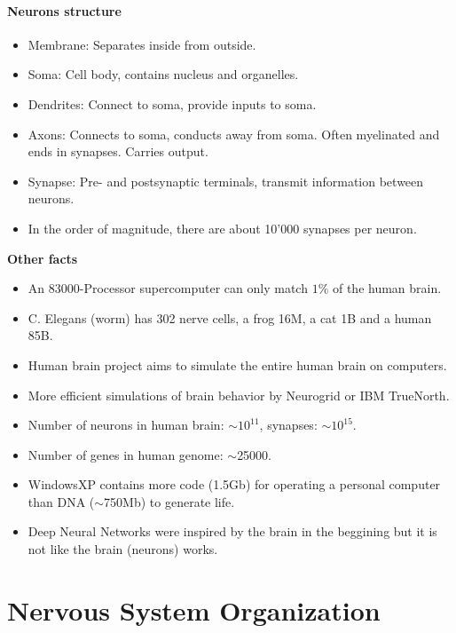 \documentclass[a4paper, 12pt]{article}
\begin{document}
\paragraph{Neurons structure}
\begin{itemize}[noitemsep,nolistsep]
	\item Membrane: Separates inside from outside.
	\item Soma: Cell body, contains nucleus and organelles.
	\item Dendrites: Connect to soma, provide inputs to soma.
	\item Axons: Connects to soma, conducts away from soma. Often myelinated and ends in synapses. Carries output.
	\item Synapse: Pre- and postsynaptic terminals, transmit information between neurons.
	\item In the order of magnitude, there are about 10'000 synapses per neuron.
\end{itemize}

\textbf{Other facts}
\begin{itemize}[noitemsep,nolistsep]
	\item An 83000-Processor supercomputer can only match $1\%$ of the human brain.
	\item C. Elegans (worm) has 302 nerve cells, a frog 16M, a cat 1B and a human 85B.
	\item Human brain project aims to simulate the entire human brain on computers.
	\item More efficient simulations of brain behavior by Neurogrid or IBM TrueNorth.
	\item Number of neurons in human brain: $\sim10^{11}$, synapses: $\sim10^{15}$.
	\item Number of genes in human genome: $\sim$25000.
	\item WindowsXP contains more code (1.5Gb) for operating a personal computer than DNA ($\sim$750Mb) to generate life.
	\item Deep Neural Networks were inspired by the brain in the beggining but it is not like the brain (neurons) works.
	
\end{itemize}

\section{Nervous System Organization}
\end{document}

